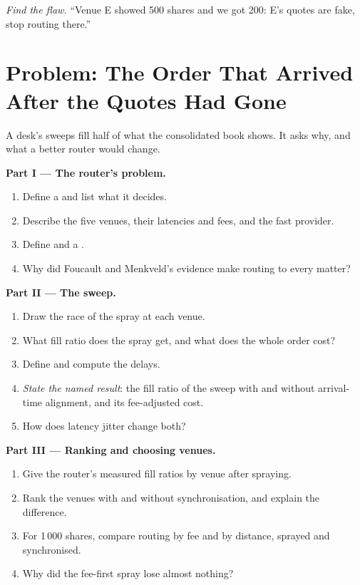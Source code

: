 \begin{exercise}[$\star\star\star$]\label{exo:mx:smart-order-routing:8}
\emph{Find the flaw.} ``Venue E showed 500 shares and we got 200: E's quotes are fake, stop routing there.''
\end{exercise}

\section{Problem: The Order That Arrived After the Quotes Had Gone}

\begin{problem}\label{pb:mx:smart-order-routing:1}
A desk's sweeps fill half of what the consolidated book shows. It asks why, and what a better router would change.

\medskip\noindent\textbf{Part I --- The router's problem.}
\begin{enumerate}
\item Define a  and list what it decides.
\item Describe the five venues, their latencies and fees, and the fast provider.
\item Define  and a .
\item Why did Foucault and Menkveld's evidence make routing to every  matter?
\end{enumerate}

\medskip\noindent\textbf{Part II --- The sweep.}
\begin{enumerate}[resume]
\item Draw the race of the spray at each venue.
\item What fill ratio does the spray get, and what does the whole order cost?
\item Define  and compute the delays.
\item \emph{State the named result}: the fill ratio of the sweep with and without arrival-time alignment, and its fee-adjusted cost.
\item How does latency jitter change both?
\end{enumerate}

\medskip\noindent\textbf{Part III --- Ranking and choosing venues.}
\begin{enumerate}[resume]
\item Give the router's measured fill ratios by venue after spraying.
\item Rank the venues with and without synchronisation, and explain the difference.
\item For 1\,000 shares, compare routing by fee and by distance, sprayed and synchronised.
\item Why did the fee-first spray lose almost nothing?
\end{enumerate}


\end{problem}
